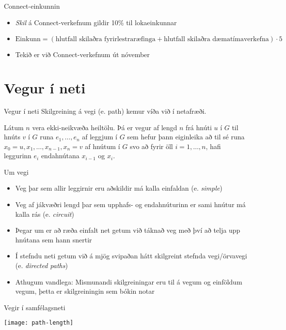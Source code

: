 \documentclass{beamer}
\begin{document}
\begin{frame}{Connect-einkunnin}
\begin{itemize}
 \item \emph{Skil} á Connect-verkefnum gildir 10\% til lokaeinkunnar
 \item $\text{Einkunn} = (\text{hlutfall skilaðra fyrirlestraræfinga} + \text{hlutfall skilaðra dæmatímaverkefna}) \cdot 5$
 \item Tekið er við Connect-verkefnum út nóvember
\end{itemize}
\end{frame}

\section{Vegur í neti}

\begin{frame}{Vegur í neti}
Skilgreining á vegi (e.  path) kemur víða við í netafræði.

\begin{tcolorbox}[title=Vegur]
Látum $n$ vera ekki-neikvæða heiltölu. Þá er vegur af lengd $n$ frá hnúti $u$ í $G$ til hnúts $v$ í $G$ runa $e_1, \ldots, e_n$ af leggjum í $G$ sem hefur þann eiginleika að til sé runa $x_0 = u, x_1, \ldots, x_{n-1}, x_n = v$ af hnútum í $G$ svo að fyrir öll $i = 1, \ldots, n$, hafi leggurinn $e_i$ endahnútana $x_{i-1}$ og $x_i$.
\end{tcolorbox}
\end{frame}

\begin{frame}{Um vegi}
\begin{itemize}
 \item Veg þar sem allir leggirnir eru aðskildir má kalla einfaldan (e. \emph{simple})
 \item Veg af jákvæðri lengd þar sem upphafs- og endahnúturinn er sami hnútur má kalla rás (e. \emph{circuit})
 \item Þegar um er að ræða einfalt net getum við táknað veg með því að telja upp hnútana sem hann snertir
 \item Í stefndu neti getum við á mjög svipaðan hátt skilgreint stefnda vegi/örvavegi (e. \emph{directed paths})
 \item Athugum vandlega: Mismunandi skilgreiningar eru til á vegum og einföldum vegum, þetta er skilgreiningin sem bókin notar
\end{itemize}
\end{frame}

\begin{frame}{Vegir í samfélagsneti}
\begin{center}
\texttt{[image: path-length]}
\end{center}
\end{frame}
\end{document}
